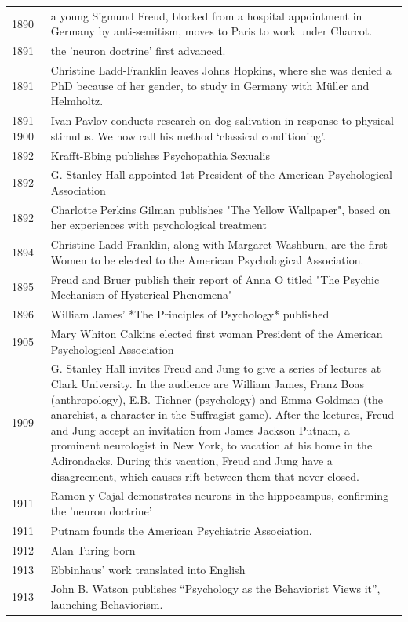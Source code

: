 \begin{longtable}[!t]{ | p{2cm} | p{11.8cm} | }
1890&a young Sigmund Freud, blocked from a hospital appointment in Germany by anti-semitism, moves to Paris to work under Charcot. \\
1891&the 'neuron doctrine' first advanced. \\
1891&Christine Ladd-Franklin leaves Johns Hopkins, where she was denied a PhD because of her gender, to study in Germany with Müller and Helmholtz. \\
1891-1900&Ivan Pavlov conducts research on dog salivation in response to physical stimulus. We now call his method ‘classical conditioning’. \\
1892&Krafft-Ebing publishes Psychopathia Sexualis \\
1892&G. Stanley Hall appointed 1st President of the American Psychological Association \\
1892&Charlotte Perkins Gilman publishes "The Yellow Wallpaper", based on her experiences with psychological treatment \\
1894&Christine Ladd-Franklin, along with Margaret Washburn, are the first Women to be elected to the American Psychological Association. \\
1895&Freud and Bruer publish their report of Anna O titled "The Psychic Mechanism of Hysterical Phenomena" \\
1896&William James’ *The Principles of Psychology* published \\
1905&Mary Whiton Calkins elected first woman President of the American Psychological Association \\
1909&G. Stanley Hall invites Freud and Jung to give a series of lectures at Clark University.  In the audience are William James, Franz Boas (anthropology), E.B. Tichner (psychology) and Emma Goldman (the anarchist, a character in the Suffragist game). After the lectures, Freud and Jung accept an invitation from James Jackson Putnam, a prominent neurologist in New York, to vacation at his home in the Adirondacks.  During this vacation, Freud and Jung have a disagreement, which causes rift between them that never closed. \\
1911&Ramon y Cajal demonstrates neurons in the hippocampus, confirming the 'neuron doctrine' \\
1911&Putnam founds the American Psychiatric Association. \\
1912&Alan Turing born \\
1913&Ebbinhaus’ work translated into English \\
1913&John B. Watson publishes “Psychology as the Behaviorist Views it”, launching Behaviorism.  \\

\end{longtable}
